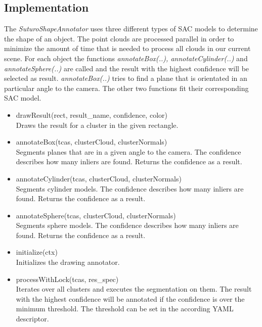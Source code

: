 \documentclass[main.tex]{subfiles}
\begin{document}
\subsection{Implementation}
The \textit{SuturoShapeAnnotator} uses three different types of SAC models to determine the shape of an object.
The point clouds are processed parallel in order to minimize the amount of time that is needed to process all clouds in our current scene.
For each object the functions \textit{annotateBox(..), annotateCylinder(..)} and \textit{annotateSphere(..)} are called and the result with the highest confidence
will be selected as result. \textit{annotateBox(..)} tries to find a plane that is orientated in an particular angle to the camera. 
The other two functions fit their corresponding SAC model.

\begin{itemize}
\item drawResult(rect, result\_name, confidence, color)\\
Draws the result for a cluster in the given rectangle.

\item annotateBox(tcas, clusterCloud, clusterNormals)\\
Segments planes that are in a given angle to the camera. The confidence describes how many inliers are found. Returns the confidence as a result.

\item annotateCylinder(tcas, clusterCloud, clusterNormals)\\
Segments cylinder models. The confidence describes how many inliers are found. Returns the confidence as a result.

\item annotateSphere(tcas, clusterCloud, clusterNormals)\\
Segments sphere models. The confidence describes how many inliers are found. Returns the confidence as a result.

\item initialize(ctx)\\
Initializes the drawing annotator.

\item processWithLock(tcas, res\_spec)\\
Iterates over all clusters and executes the segmentation on them. The result with the highest confidence will be annotated if
the confidence is over the minimum threshold. The threshold can be set in the according YAML descriptor.
\end{itemize}
\end{document}
